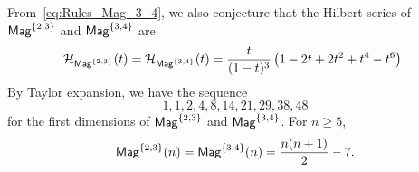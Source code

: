 From~\eqref{eq:Rules_Mag_3_4}, we also conjecture that the Hilbert
series of $\mathsf{Mag}^{\{2, 3\}}$ and $\mathsf{Mag}^{\{3, 4\}}$ are
\begin{equation}
    \mathcal{H}_{\mathsf{Mag}^{\{2, 3\}}}(t) =
    \mathcal{H}_{\mathsf{Mag}^{\{3, 4\}}}(t) =
    \frac{t}{(1 - t)^3}
    \left(1 - 2t + 2t^2 + t^4 - t^6\right).
\end{equation}
By Taylor expansion, we have the sequence
\begin{equation}
    1, 1, 2, 4, 8, 14, 21, 29, 38, 48
\end{equation}
for the first dimensions of $\mathsf{Mag}^{\{2, 3\}}$ and $\mathsf{Mag}^{\{3, 4\}}$.
For $n \geq 5$, 
\begin{equation}
    \mathsf{Mag}^{\{2, 3\}}(n) =\mathsf{Mag}^{\{3, 4\}}(n) = \frac{n(n+1)}{2} - 7.
\end{equation}
\medbreak
